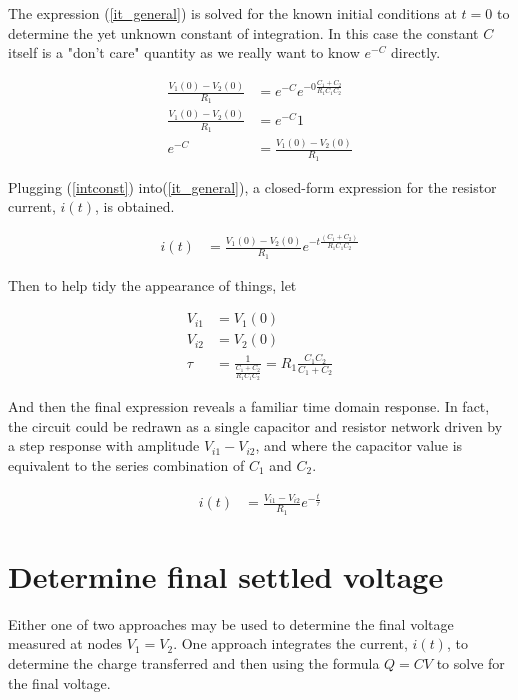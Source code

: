 \documentclass[12pt,letterpaper]{report}
\begin{document}
	The expression (\ref{it_general}) is solved for the known initial conditions at $t=0$ to determine the yet unknown constant of integration.  In this case the constant $C$ itself is a "don't care" quantity as we really want to know $e^{-C}$ directly.
	
	\begin{align}
		\frac{V_1(0) - V_2(0)}{R_1} &=  e^{-C} e^{-0  \frac{C_1 + C_2}{R_1 C_1 C_2}} \nonumber \\
		 \frac{V_1(0) - V_2(0)}{R_1} &=  e^{-C} 1 \nonumber \\
		 e^{-C} &= \frac{V_1(0) - V_2(0)}{R_1} \label{intconst}
	\end{align}

	Plugging (\ref{intconst}) into(\ref{it_general}), a closed-form expression for the resistor current, $i(t)$, is obtained.
	
	\begin{align}
		i(t) &= \frac{V_1(0) - V_2(0)}{R_1}  e^{-t \frac{(C_1 + C_2)}{R_1 C_1 C_2}} 
	\end{align}
	
	Then to help tidy the appearance of things, let
	
	\begin{align}
		V_{i1} &= V_1(0)   \\
		V_{i2}  &=  V_2(0) \\
		\tau &= \frac{1}{ \frac{C_1 + C_2}{R_1 C_1 C_2} } = R_1 \frac{C_1 C_2}{C_1 + C_2}
	\end{align}

	And then the final expression reveals a familiar time domain response. In fact, the circuit could be redrawn as a single capacitor and resistor network driven by a step response with amplitude $V_{i1} - V_{i2}$, and where the capacitor value is equivalent to the series combination of $C_1$ and $C_2$.
	
	\begin{align}
	i(t) &= \frac{V_{i1} - V_{i2}}{R_1}  e^{-\frac{t}{\tau}} 
	\end{align}

	\section{Determine final settled voltage}
	Either one of two approaches may be used to determine the final voltage measured at nodes $V_1 = V_2$.  One approach integrates the current, $i(t)$, to determine the charge transferred and then using the formula $Q=CV$ to solve for the final voltage.  
	
\end{document}
